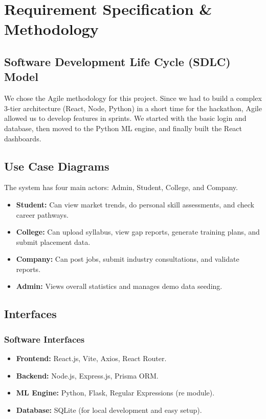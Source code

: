 \documentclass[12pt,a4paper]{report}
\begin{document}
\chapter{Requirement Specification \& Methodology}

\section{Software Development Life Cycle (SDLC) Model}
We chose the Agile methodology for this project. Since we had to build a complex 3-tier architecture (React, Node, Python) in a short time for the hackathon, Agile allowed us to develop features in sprints. We started with the basic login and database, then moved to the Python ML engine, and finally built the React dashboards.

\section{Use Case Diagrams}
The system has four main actors: Admin, Student, College, and Company.
\begin{itemize}
    \item \textbf{Student:} Can view market trends, do personal skill assessments, and check career pathways.
    \item \textbf{College:} Can upload syllabus, view gap reports, generate training plans, and submit placement data.
    \item \textbf{Company:} Can post jobs, submit industry consultations, and validate reports.
    \item \textbf{Admin:} Views overall statistics and manages demo data seeding.
\end{itemize}

\section{Interfaces}
\subsection{Software Interfaces}
\begin{itemize}
    \item \textbf{Frontend:} React.js, Vite, Axios, React Router.
    \item \textbf{Backend:} Node.js, Express.js, Prisma ORM.
    \item \textbf{ML Engine:} Python, Flask, Regular Expressions (re module).
    \item \textbf{Database:} SQLite (for local development and easy setup).
\end{itemize}
\end{document}

